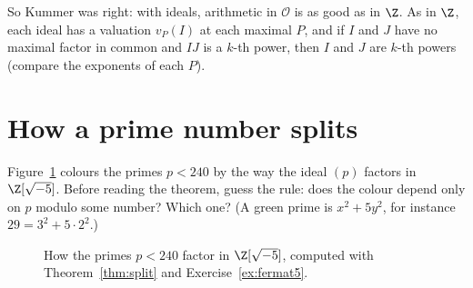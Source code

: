 So Kummer was right: with ideals, arithmetic in $\mathcal O$ is as good as in $\Z$. As in $\Z$, each ideal has a valuation $v_P(I)$ at each maximal $P$, and if $I$ and $J$ have no maximal factor in common and $IJ$ is a $k$-th power, then $I$ and $J$ are $k$-th powers (compare the exponents of each $P$).

\section{How a prime number splits}

\begin{think}
Figure~\ref{fig:split} colours the primes $p<240$ by the way the ideal $(p)$ factors in $\Z[\sqrt{-5}]$. Before reading the theorem, guess the rule: does the colour depend only on $p$ modulo some number? Which one? (A green prime is $x^2+5y^2$, for instance $29=3^2+5\cdot2^2$.)
\end{think}

\begin{figure}[ht]
\centering
{}
\caption{How the primes $p<240$ factor in $\Z[\sqrt{-5}]$, computed with Theorem~\ref{thm:split} and Exercise~\ref{ex:fermat5}.}
\label{fig:split}
\end{figure}

